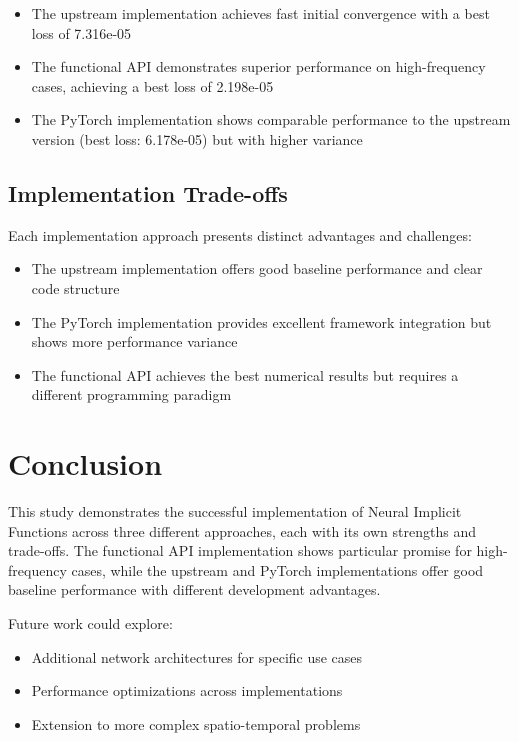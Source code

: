 \documentclass[10pt,journal,compsoc]{IEEEtran}
\begin{document}
\begin{itemize}
    \item The upstream implementation achieves fast initial convergence with a best loss of 7.316e-05
    \item The functional API demonstrates superior performance on high-frequency cases, achieving a best loss of 2.198e-05
    \item The PyTorch implementation shows comparable performance to the upstream version (best loss: 6.178e-05) but with higher variance
\end{itemize}

\subsection{Implementation Trade-offs}
Each implementation approach presents distinct advantages and challenges:

\begin{itemize}
    \item The upstream implementation offers good baseline performance and clear code structure
    \item The PyTorch implementation provides excellent framework integration but shows more performance variance
    \item The functional API achieves the best numerical results but requires a different programming paradigm
\end{itemize}

\section{Conclusion}
This study demonstrates the successful implementation of Neural Implicit Functions across three different approaches, each with its own strengths and trade-offs. The functional API implementation shows particular promise for high-frequency cases, while the upstream and PyTorch implementations offer good baseline performance with different development advantages.

Future work could explore:
\begin{itemize}
    \item Additional network architectures for specific use cases
    \item Performance optimizations across implementations
    \item Extension to more complex spatio-temporal problems
\end{itemize}



\end{document}
